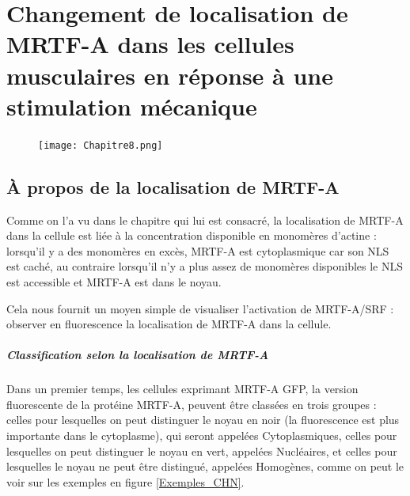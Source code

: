 %
%
%

\chapter{Changement de localisation de MRTF-A dans les cellules musculaires en réponse à une stimulation mécanique}
\begin{figure}
\texttt{[image: Chapitre8.png]}

\end{figure}
\newpage
\section{À propos de la localisation de MRTF-A}

 Comme on l'a vu dans le chapitre qui lui est consacré, la localisation de MRTF-A dans la cellule est liée à la concentration disponible en monomères d'actine : lorsqu'il y a des monomères en excès, MRTF-A est cytoplasmique car son NLS est caché, au contraire lorsqu'il n'y a plus assez de monomères disponibles le NLS est accessible et MRTF-A est dans le noyau. 
 
 Cela nous fournit un moyen simple de visualiser l'activation de MRTF-A/SRF : observer en fluorescence la localisation de MRTF-A dans la cellule. 
 
 \paragraph{Classification selon la localisation de MRTF-A}
 
 Dans un premier temps, les cellules exprimant MRTF-A GFP, la version fluorescente de la protéine MRTF-A, peuvent être classées en trois groupes : celles pour lesquelles on peut distinguer le noyau en noir (la fluorescence est plus importante dans le cytoplasme), qui seront appelées Cytoplasmiques, celles pour lesquelles on peut distinguer le noyau en vert, appelées Nucléaires, et celles pour lesquelles le noyau ne peut être distingué, appelées Homogènes, comme on peut le voir sur les exemples en figure  \ref{Exemples_CHN}.
 
